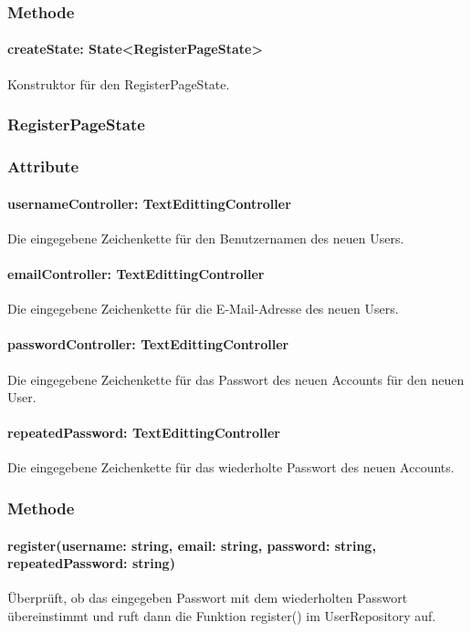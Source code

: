 \documentclass{entwurfsheft}
\begin{document}
\subsubsection*{Methode}
\paragraph*{createState: State<RegisterPageState>} Konstruktor für den RegisterPageState.

\subsubsection{RegisterPageState}\label{sec:RegisterPageState}
\subsubsection*{Attribute}
\paragraph*{usernameController: TextEdittingController} Die eingegebene Zeichenkette für den Benutzernamen des neuen Users.
\paragraph*{emailController: TextEdittingController} Die eingegebene Zeichenkette für die E-Mail-Adresse des neuen Users.
\paragraph*{passwordController: TextEdittingController} Die eingegebene Zeichenkette für das Passwort des neuen Accounts für den neuen User.
\paragraph*{repeatedPassword: TextEdittingController} Die eingegebene Zeichenkette für das wiederholte Passwort des neuen Accounts.

\subsubsection*{Methode}
\paragraph*{register(username: string, email: string, password: string, repeatedPassword: string)} Überprüft, ob das eingegeben Passwort mit dem wiederholten Passwort übereinstimmt und ruft dann die Funktion register() im UserRepository auf.
\end{document}
